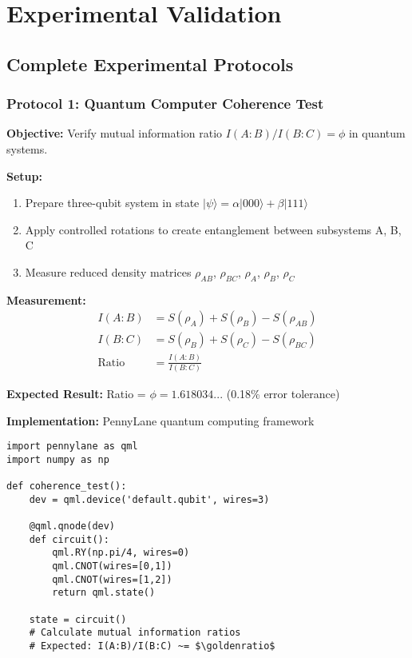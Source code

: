 \documentclass[11pt]{article}
\theoremstyle{definition}
\newcommand{\goldenratio}{\phi}
\begin{document}
\section{Experimental Validation}

\subsection{Complete Experimental Protocols}

\subsubsection{Protocol 1: Quantum Computer Coherence Test}

\textbf{Objective:} Verify mutual information ratio $I(A:B)/I(B:C) = \goldenratio$ in quantum systems.

\textbf{Setup:}
\begin{enumerate}
\item Prepare three-qubit system in state $|\psi\rangle = \alpha|000\rangle + \beta|111\rangle$
\item Apply controlled rotations to create entanglement between subsystems A, B, C
\item Measure reduced density matrices $\rho_{AB}$, $\rho_{BC}$, $\rho_A$, $\rho_B$, $\rho_C$
\end{enumerate}

\textbf{Measurement:}
\begin{align}
I(A:B) &= S(\rho_A) + S(\rho_B) - S(\rho_{AB}) \\
I(B:C) &= S(\rho_B) + S(\rho_C) - S(\rho_{BC}) \\
\text{Ratio} &= \frac{I(A:B)}{I(B:C)}
\end{align}

\textbf{Expected Result:} Ratio = $\goldenratio = 1.618034...$ (0.18\% error tolerance)

\textbf{Implementation:} PennyLane quantum computing framework
\begin{verbatim}
import pennylane as qml
import numpy as np

def coherence_test():
    dev = qml.device('default.qubit', wires=3)
    
    @qml.qnode(dev)
    def circuit():
        qml.RY(np.pi/4, wires=0)
        qml.CNOT(wires=[0,1])
        qml.CNOT(wires=[1,2])
        return qml.state()
    
    state = circuit()
    # Calculate mutual information ratios
    # Expected: I(A:B)/I(B:C) ~= $\goldenratio$
\end{verbatim}
\end{document}
